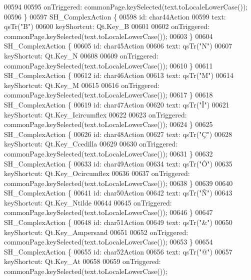 \begin{DoxyCode}
00594 
00595         onTriggered: commonPage.keySelected(text.toLocaleLowerCase());
00596     \}
00597     SH\_ComplexAction \{
00598         \textcolor{keywordtype}{id}: char44Action
00599         text: qsTr(\textcolor{stringliteral}{"B"})
00600         keyShortcut: Qt.Key\_B
00601 
00602         onTriggered: commonPage.keySelected(text.toLocaleLowerCase());
00603     \}
00604     SH\_ComplexAction \{
00605         \textcolor{keywordtype}{id}: char45Action
00606         text: qsTr(\textcolor{stringliteral}{"N"})
00607         keyShortcut: Qt.Key\_N
00608 
00609         onTriggered: commonPage.keySelected(text.toLocaleLowerCase());
00610     \}
00611     SH\_ComplexAction \{
00612         \textcolor{keywordtype}{id}: char46Action
00613         text: qsTr(\textcolor{stringliteral}{"M"})
00614         keyShortcut: Qt.Key\_M
00615 
00616         onTriggered: commonPage.keySelected(text.toLocaleLowerCase());
00617     \}
00618     SH\_ComplexAction \{
00619         \textcolor{keywordtype}{id}: char47Action
00620         text: qsTr(\textcolor{stringliteral}{"Î"})
00621         keyShortcut: Qt.Key\_Icircumflex
00622 
00623         onTriggered: commonPage.keySelected(text.toLocaleLowerCase());
00624     \}
00625     SH\_ComplexAction \{
00626         \textcolor{keywordtype}{id}: char48Action
00627         text: qsTr(\textcolor{stringliteral}{"Ç"})
00628         keyShortcut: Qt.Key\_Ccedilla
00629 
00630         onTriggered: commonPage.keySelected(text.toLocaleLowerCase());
00631     \}
00632     SH\_ComplexAction \{
00633         \textcolor{keywordtype}{id}: char49Action
00634         text: qsTr(\textcolor{stringliteral}{"Ô"})
00635         keyShortcut: Qt.Key\_Ocircumflex
00636 
00637         onTriggered: commonPage.keySelected(text.toLocaleLowerCase());
00638     \}
00639 
00640     SH\_ComplexAction \{
00641         \textcolor{keywordtype}{id}: char50Action
00642         text: qsTr(\textcolor{stringliteral}{"Ñ"})
00643         keyShortcut: Qt.Key\_Ntilde
00644 
00645         onTriggered: commonPage.keySelected(text.toLocaleLowerCase());
00646     \}
00647     SH\_ComplexAction \{
00648         \textcolor{keywordtype}{id}: char51Action
00649         text: qsTr(\textcolor{stringliteral}{"&"})
00650         keyShortcut: Qt.Key\_Ampersand
00651 
00652         onTriggered: commonPage.keySelected(text.toLocaleLowerCase());
00653     \}
00654     SH\_ComplexAction \{
00655         \textcolor{keywordtype}{id}: char52Action
00656         text: qsTr(\textcolor{stringliteral}{"@"})
00657         keyShortcut: Qt.Key\_At
00658 
00659         onTriggered: commonPage.keySelected(text.toLocaleLowerCase());

\end{DoxyCode}
